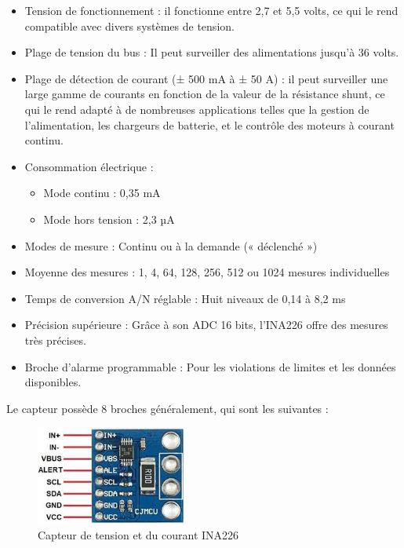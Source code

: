 \begin{itemize}
	\item Tension de fonctionnement : il fonctionne entre 2,7 et 5,5 volts, ce qui le rend compatible avec divers systèmes de tension.
	
	\item Plage de tension du bus : Il peut surveiller des alimentations jusqu'à 36 volts.
	
	\item Plage de détection de courant (± 500 mA à ± 50 A) : il peut surveiller une large gamme de courants en fonction de la valeur de la résistance shunt, ce qui le rend adapté à de nombreuses applications telles que la gestion de l'alimentation, les chargeurs de batterie, et le contrôle des moteurs à courant continu.
	
	\item Consommation électrique :
	\begin{itemize}
		\item  Mode continu : 0,35 mA
		\item Mode hors tension : 2,3 µA
	\end{itemize}
	
	\item Modes de mesure : Continu ou à la demande (« déclenché »)
	
	\item Moyenne des mesures : 1, 4, 64, 128, 256, 512 ou 1024 mesures individuelles
	
	\item Temps de conversion A/N réglable : Huit niveaux de 0,14 à 8,2 ms
	
	\item Précision supérieure : Grâce à son ADC 16 bits, l'INA226 offre des mesures très précises.
	
	\item Broche d'alarme programmable : Pour les violations de limites et les données disponibles. 
\end{itemize}


Le capteur possède 8 broches généralement, qui sont les suivantes :\\
\begin{figure}[H]
	\centering
	\includegraphics[width=5cm]{./img/INA226.jpeg}
	\caption{Capteur de tension et du courant INA226 }
	\label{i1}
\end{figure}

